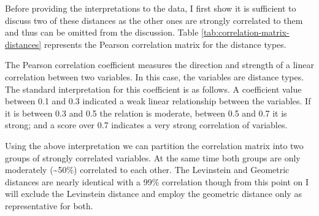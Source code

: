     Before providing the interpretations to the data, I first show it is sufficient to discuss two of these distances as the other ones are strongly correlated to them and thus can be omitted from the discussion. Table \ref{tab:correlation-matrix-distances} represents the Pearson correlation matrix for the distance types. 
    
    \begin{table}[!ht]
    \centering
    \caption{Pearson correlation coefficients for pairs of distance measure types}
    \label{tab:correlation-matrix-distances}
    \end{table}
    
    The Pearson correlation coefficient measures the direction and strength of a linear correlation between two variables. In this case, the variables are distance types. The standard interpretation for this coefficient is as follows. A coefficient value between 0.1 and 0.3 indicated a weak linear relationship between the variables. If it is between 0.3 and 0.5 the relation is moderate, between 0.5 and 0.7 it is strong; and a score over 0.7 indicates a very strong correlation of variables. 
    
    Using the above interpretation we can partition the correlation matrix into two groups of strongly correlated variables. At the same time both groups are only moderately (\textasciitilde50\%) correlated to each other. The Levinstein and Geometric distances are nearly identical with a 99\% correlation though from this point on I will exclude the Levinstein distance and employ the geometric distance only as representative for both. 
    

